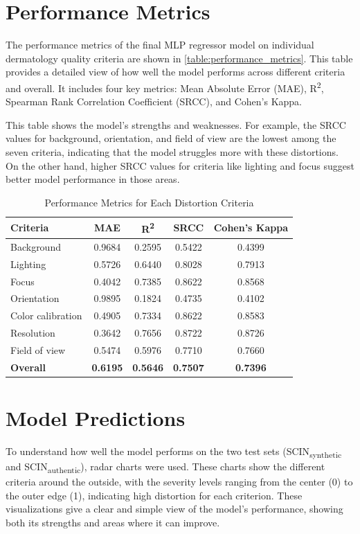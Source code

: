 \section{Performance Metrics}
\label{sec:PerformanceMetrics}
The performance metrics of the final MLP regressor model on individual dermatology quality criteria are shown in \autoref{table:performance_metrics}. This table provides a detailed view of how well the model performs across different criteria and overall. It includes four key metrics: Mean Absolute Error (MAE), R\textsuperscript{2}, Spearman Rank Correlation Coefficient (SRCC), and Cohen’s Kappa. \par
\vspace{\baselineskip}
\noindent
This table shows the model’s strengths and weaknesses. For example, the SRCC values for background, orientation, and field of view are the lowest among the seven criteria, indicating that the model struggles more with these distortions. On the other hand, higher SRCC values for criteria like lighting and focus suggest better model performance in those areas. \par
 \begin{table}[ht]
    \centering
    \begin{tabular}{|l|c|c|c|c|}
        \hline
        \textbf{Criteria} & \textbf{MAE} & \textbf{R\textsuperscript{2}} & \textbf{SRCC} & \textbf{Cohen's Kappa} \\
        \hline
        Background & 0.9684 & 0.2595 & 0.5422 & 0.4399 \\
        Lighting & 0.5726 & 0.6440 & 0.8028 & 0.7913 \\
        Focus & 0.4042 & 0.7385 & 0.8622 & 0.8568 \\
        Orientation & 0.9895 & 0.1824 & 0.4735 & 0.4102 \\
        Color calibration & 0.4905 & 0.7334 & 0.8622 & 0.8583 \\
        Resolution & 0.3642 & 0.7656 & 0.8722 & 0.8726 \\
        Field of view & 0.5474 & 0.5976 & 0.7710 & 0.7660 \\
        \hline
        \textbf{Overall} & \textbf{0.6195} & \textbf{0.5646} & \textbf{0.7507} & \textbf{0.7396} \\
        \hline
    \end{tabular}
    \caption{Performance Metrics for Each Distortion Criteria}
    \label{table:performance_metrics}
\end{table}

\section{Model Predictions}
\label{sec:VisualizingPredictions}
To understand how well the model performs on the two test sets (SCIN\textsubscript{synthetic} and SCIN\textsubscript{authentic}), radar charts were used. These charts show the different criteria around the outside, with the severity levels ranging from the center (0) to the outer edge (1), indicating high distortion for each criterion. These visualizations give a clear and simple view of the model’s performance, showing both its strengths and areas where it can improve. \par

